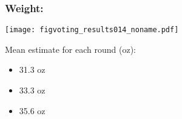 \begin{frame}
  \frametitle{Weight:}

  \begin{center}
    \texttt{[image: figvoting\_results014\_noname.pdf]}    
  \end{center}

  \begin{block}{Mean estimate for each round (oz):}
  \begin{itemize}
  \item 
    31.3 oz   
  \item 
    33.3 oz
  \item 
    35.6 oz
  \end{itemize}
  \end{block}


\end{frame}


\begin{comment}

\end{comment}

